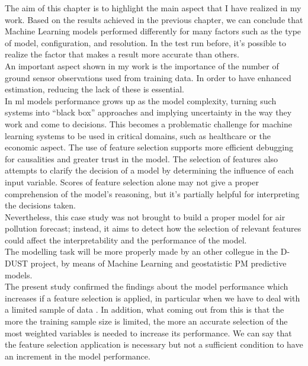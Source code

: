 The aim of this chapter is to highlight the main aspect that I have realized in my work.
Based on the results achieved in the previous chapter, we can conclude that Machine Learning models performed differently for many factors such as the type of model, configuration, and resolution.
In the test run before, it's possible to realize the factor that makes a result more accurate than others.\\
An important aspect shown in my work is the importance of the number of ground sensor observations used from training data. In order to have enhanced estimation, reducing the lack of these is essential.\\
In \acrshort{ml} models performance grows up as the model complexity, turning such systems into “black box” approaches and implying uncertainty in the way they work and come to decisions. 
This becomes a problematic challenge for machine learning systems to be used in critical domains, such as healthcare or the economic aspect.
The use of feature selection supports more efficient debugging for causalities and greater trust in the model.
The selection of features also attempts to clarify the decision of a model by determining the influence of each input variable. 
Scores of feature selection alone may not give a proper comprehension of the model’s reasoning, but it's partially helpful for interpreting the decisions taken.\\
Nevertheless, this case study was not brought to build a proper model for air pollution forecast; instead, it aims to detect how the selection of relevant features could affect the interpretability and the performance of the model. \\
The modelling task will be more properly made by an other collegue in the D-DUST project, by means of Machine Learning and geostatistic PM predictive models.\\
The present study confirmed the findings about the model performance which increases if a feature selection is applied, in particular when we have to deal with a limited sample of data \cite{vabalas2019machine}. 
In addition, what coming out from this is that the more the training sample size is limited, the more an accurate selection of the most weighted variables is needed to increase its performance.
We can say that the feature selection application is necessary but not a sufficient condition to have an increment in the model performance.
\begin{comment}
In this work, so it is highlighted the effect of how the training in \acrshort{ml} should benefit from an accurate selection of variables. 
\end{comment}
